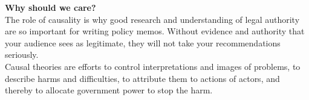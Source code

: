 \documentclass[aspectratio=169]{beamer}
\theoremstyle{principle}
\begin{document}

\begin{frame}

\begin{center}
\Huge\textbf{Why should we care?}\\
\bigskip
\bigskip
\large The role of causality is why good research and understanding of legal authority are so important for writing policy memos. Without evidence and authority that your audience sees as legitimate, they will not take your recommendations seriously.\\
\bigskip
Causal theories are efforts to control interpretations and images of problems, to describe harms and difficulties, to attribute them to actions of actors, and thereby to allocate government power to stop the harm.
\\
\end{center}

\end{frame}
\end{document}

